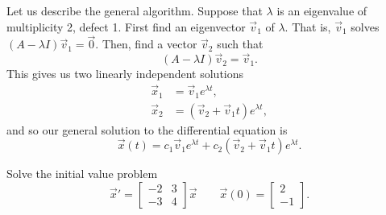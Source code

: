 Let us describe the general algorithm.  Suppose that $\lambda$ is an
eigenvalue of multiplicity 2, defect 1.
First find an eigenvector $\vec{v}_1$ of $\lambda$.  
That is, $\vec{v}_1$ solves
$(A-\lambda I)\vec{v}_1  = \vec{0}$.
Then, find a vector $\vec{v}_2$ such that
\begin{equation*}
(A-\lambda I)\vec{v}_2 = \vec{v}_1 .
\end{equation*}
This gives us two linearly independent solutions
\begin{align*}
\vec{x}_1 & = \vec{v}_1 e^{\lambda t} , \\
\vec{x}_2 & = \left( \vec{v}_2 + \vec{v}_1 t \right) e^{\lambda t},
\end{align*}
and so our general solution to the differential equation is
\begin{equation*}
\vec{x}(t) = c_1\vec{v}_1e^{\lambda t} + c_2\left(\vec{v}_2 + \vec{v}_1 t \right) e^{\lambda t}.
\end{equation*}

\begin{example}
Solve the initial value problem
\begin{equation*}
\vec{x}' = \begin{bmatrix} -2 & 3 \\ -3 & 4 \end{bmatrix}\vec{x} \qquad \vec{x}(0) = \begin{bmatrix} 2 \\ -1 \end{bmatrix}.
\end{equation*}
\end{example}

